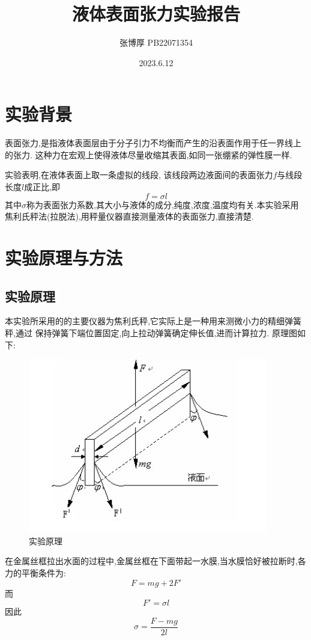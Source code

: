\documentclass[12pt,a4paper,oneside]{ctexart}
\title{液体表面张力实验报告}
\author{张博厚 PB22071354}
\date{2023.6.12}
\begin{document}
\maketitle
\tableofcontents
\newpage
\section{实验背景}
表面张力,是指液体表面层由于分子引力不均衡而产生的沿表面作用于任一界线上的张力.
这种力在宏观上使得液体尽量收缩其表面,如同一张绷紧的弹性膜一样.
\par 实验表明,在液体表面上取一条虚拟的线段,
该线段两边液面间的表面张力$f$与线段长度$l$成正比,即
\begin{equation}
    f=\sigma l
\end{equation}
其中$\sigma$称为表面张力系数,其大小与液体的成分,纯度,浓度,温度均有关.本实验采用
焦利氏秤法(拉脱法),用秤量仪器直接测量液体的表面张力,直接清楚.
\section{实验原理与方法}
\subsection{实验原理}
本实验所采用的的主要仪器为焦利氏秤,它实际上是一种用来测微小力的精细弹簧秤,通过
保持弹簧下端位置固定,向上拉动弹簧确定伸长值,进而计算拉力.
原理图如下:
\begin{figure}[H]
    \centering
    \includegraphics[scale=0.8]{原理图.png}
    \caption{实验原理}
\end{figure}
在金属丝框拉出水面的过程中,金属丝框在下面带起一水膜,当水膜恰好被拉断时,各力的平衡条件为:
\begin{equation}
    F=mg+2F'
\end{equation}
而\begin{equation}
    F'=\sigma l
\end{equation}
因此
\begin{equation}
    \sigma=\frac{F-mg}{2l}
\end{equation}
\end{document}
